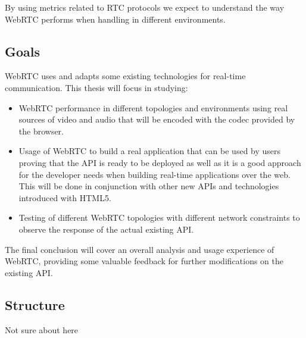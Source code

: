 By using metrics related to RTC protocols we expect to understand the way WebRTC performs when handling in different environments.

\subsection{Goals}

WebRTC uses and adapts some existing technologies for real-time communication. This thesis will focus in studying:

\begin{itemize}
	\item WebRTC performance in different topologies and environments using real sources of video and audio that will be encoded with the codec provided by the browser.
	
	\item Usage of WebRTC to build a real application that can be used by users proving that the API is ready to be deployed as well as it is a good approach for the developer needs when building real-time applications over the web. This will be done in conjunction with other new APIs and technologies introduced with HTML5.
	
	\item Testing of different WebRTC topologies with different network constraints to observe the response of the actual existing API.
\end{itemize}

The final conclusion will cover an overall analysis and usage experience of WebRTC, providing some valuable feedback for further modifications on the existing API.

\subsection{Structure}

Not sure about here